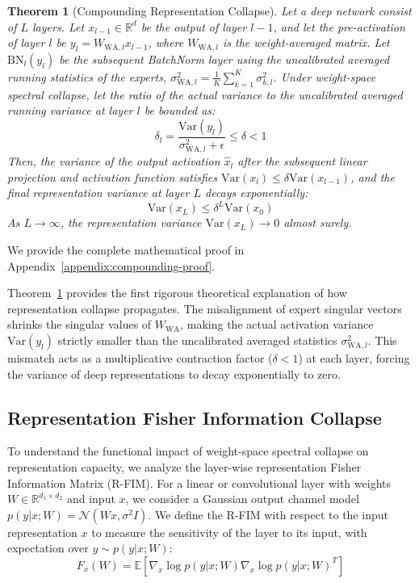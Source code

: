 \documentclass{article}
\theoremstyle{plain}
\newtheorem{theorem}{Theorem}[section]
\theoremstyle{definition}
\theoremstyle{remark}
\begin{document}
\begin{theorem}[Compounding Representation Collapse]
\label{thm:compounding-collapse}
Let a deep network consist of $L$ layers. Let $x_{l-1} \in \mathbb{R}^{d}$ be the output of layer $l-1$, and let the pre-activation of layer $l$ be $y_l = W_{\text{WA}, l} x_{l-1}$, where $W_{\text{WA}, l}$ is the weight-averaged matrix. Let $\text{BN}_l(y_l)$ be the subsequent BatchNorm layer using the uncalibrated averaged running statistics of the experts, $\sigma^2_{\text{WA}, l} = \frac{1}{K}\sum_{k=1}^K \sigma^2_{k, l}$. 
Under weight-space spectral collapse, let the ratio of the actual variance to the uncalibrated averaged running variance at layer $l$ be bounded as:
\begin{equation}
    \delta_l = \frac{\text{Var}(y_l)}{\sigma^2_{\text{WA}, l} + \epsilon} \le \delta < 1
\end{equation}
Then, the variance of the output activation $\hat{x}_l$ after the subsequent linear projection and activation function satisfies $\text{Var}(x_l) \le \delta \text{Var}(x_{l-1})$, and the final representation variance at layer $L$ decays exponentially:
\begin{equation}
    \text{Var}(x_L) \le \delta^L \text{Var}(x_0)
\end{equation}
As $L \to \infty$, the representation variance $\text{Var}(x_L) \to 0$ almost surely.
\end{theorem}

We provide the complete mathematical proof in Appendix~\ref{appendix:compounding-proof}.

Theorem~\ref{thm:compounding-collapse} provides the first rigorous theoretical explanation of how representation collapse propagates. The misalignment of expert singular vectors shrinks the singular values of $W_{\text{WA}}$, making the actual activation variance $\text{Var}(y_l)$ strictly smaller than the uncalibrated averaged statistics $\sigma^2_{\text{WA}, l}$. This mismatch acts as a multiplicative contraction factor ($\delta < 1$) at each layer, forcing the variance of deep representations to decay exponentially to zero.

\subsection{Representation Fisher Information Collapse}
To understand the functional impact of weight-space spectral collapse on representation capacity, we analyze the layer-wise representation Fisher Information Matrix (R-FIM). For a linear or convolutional layer with weights $W \in \mathbb{R}^{d_1 \times d_2}$ and input $x$, we consider a Gaussian output channel model $p(y|x; W) = \mathcal{N}(Wx, \sigma^2 I)$. We define the R-FIM with respect to the input representation $x$ to measure the sensitivity of the layer to its input, with expectation over $y \sim p(y|x; W)$:
\begin{equation}
    F_x(W) = \mathbb{E} \left[ \nabla_x \log p(y|x; W) \nabla_x \log p(y|x; W)^T \right]
\end{equation}
\end{document}
